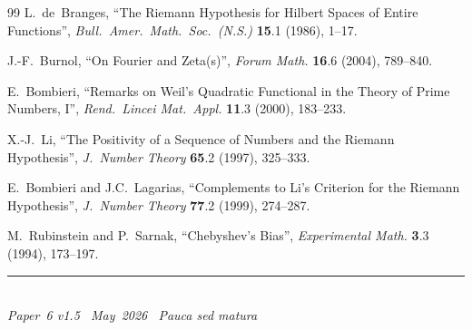 \documentclass[11pt]{article}
\begin{document}
\begin{thebibliography}{99}
L.~de~Branges,
``The Riemann Hypothesis for Hilbert Spaces of Entire Functions'',
\emph{Bull.\ Amer.\ Math.\ Soc.\ (N.S.)} \textbf{15}.1 (1986),
1--17.

J.-F.~Burnol,
``On Fourier and Zeta(s)'',
\emph{Forum Math.} \textbf{16}.6 (2004), 789--840.

E.~Bombieri,
``Remarks on Weil's Quadratic Functional in the Theory of Prime
Numbers, I'',
\emph{Rend.\ Lincei Mat.\ Appl.} \textbf{11}.3 (2000), 183--233.

X.-J.~Li,
``The Positivity of a Sequence of Numbers and the Riemann
Hypothesis'',
\emph{J.\ Number Theory} \textbf{65}.2 (1997), 325--333.

E.~Bombieri and J.C.~Lagarias,
``Complements to Li's Criterion for the Riemann Hypothesis'',
\emph{J.\ Number Theory} \textbf{77}.2 (1999), 274--287.

M.~Rubinstein and P.~Sarnak,
``Chebyshev's Bias'',
\emph{Experimental Math.} \textbf{3}.3 (1994), 173--197.

\end{thebibliography}

\enlargethispage{3\baselineskip}
\vspace*{\fill}
\begin{minipage}{\linewidth}
\rule{\linewidth}{0.4pt}\smallskip\\
\small\emph{Paper~6 v1.5 \textperiodcentered\ May~2026
\textperiodcentered\ Pauca sed matura}
\end{minipage}
\end{document}
